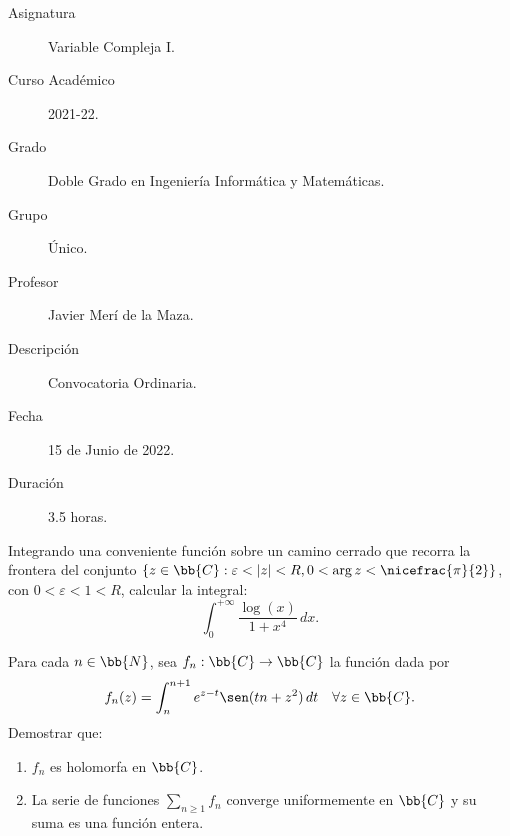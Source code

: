 \documentclass[12pt]{article}
\begin{document}

    
    

    \begin{description}
        \item[Asignatura] Variable Compleja I.
        \item[Curso Académico] 2021-22.
        \item[Grado] Doble Grado en Ingeniería Informática y Matemáticas.
        \item[Grupo] Único.
        \item[Profesor] Javier Merí de la Maza.
        \item[Descripción] Convocatoria Ordinaria.
        \item[Fecha] 15 de Junio de 2022.
        \item[Duración] 3.5 horas.
    \end{description}
    \newpage

    \begin{ejercicio}[2.5 puntos]
        Integrando una conveniente función sobre un camino cerrado que recorra la frontera del conjunto $\{z \in \bb{C} : \varepsilon < |z| < R, 0 < \arg z < \nicefrac{\pi}{2}\}$, con $0 < \varepsilon < 1 < R$, calcular la integral:
        \begin{equation*}
            \int_0^{+\infty} \frac{\log(x)}{1 + x^4} \, dx.
        \end{equation*}
    \end{ejercicio}

    \begin{ejercicio}[2.5 puntos]
        Para cada $n \in \bb{N}$, sea $f_n : \bb{C} \to \bb{C}$ la función dada por
        \begin{equation*}
            f_n(z) = \int_n^{n+1} e^{z-t} \sen(tn + z^2) \, dt \quad \forall z \in \bb{C}.
        \end{equation*}
        Demostrar que:
        \begin{enumerate}
            \item $f_n$ es holomorfa en $\bb{C}$.
            \item La serie de funciones $\sum\limits_{n\geq 1} f_n$ converge uniformemente en $\bb{C}$ y su suma es una función entera.
        \end{enumerate}
    \end{ejercicio}
\end{document}
